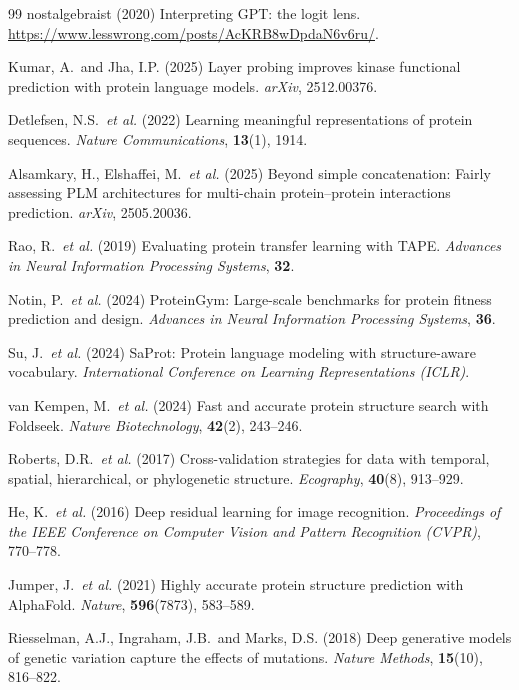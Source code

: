 \documentclass[11pt,a4paper]{article}
\begin{document}
\begin{thebibliography}{99}
nostalgebraist (2020)
Interpreting GPT: the logit lens.
\url{https://www.lesswrong.com/posts/AcKRB8wDpdaN6v6ru/}.

Kumar, A.\ and Jha, I.P. (2025)
Layer probing improves kinase functional prediction with protein language models.
\textit{arXiv}, 2512.00376.

Detlefsen, N.S.\ \textit{et al.} (2022)
Learning meaningful representations of protein sequences.
\textit{Nature Communications}, \textbf{13}(1), 1914.

Alsamkary, H., Elshaffei, M.\ \textit{et al.} (2025)
Beyond simple concatenation: Fairly assessing PLM architectures for multi-chain
protein--protein interactions prediction.
\textit{arXiv}, 2505.20036.

Rao, R.\ \textit{et al.} (2019)
Evaluating protein transfer learning with TAPE.
\textit{Advances in Neural Information Processing Systems}, \textbf{32}.

Notin, P.\ \textit{et al.} (2024)
ProteinGym: Large-scale benchmarks for protein fitness prediction and design.
\textit{Advances in Neural Information Processing Systems}, \textbf{36}.

Su, J.\ \textit{et al.} (2024)
SaProt: Protein language modeling with structure-aware vocabulary.
\textit{International Conference on Learning Representations (ICLR)}.

van Kempen, M.\ \textit{et al.} (2024)
Fast and accurate protein structure search with Foldseek.
\textit{Nature Biotechnology}, \textbf{42}(2), 243--246.

Roberts, D.R.\ \textit{et al.} (2017)
Cross-validation strategies for data with temporal, spatial, hierarchical, or
phylogenetic structure.
\textit{Ecography}, \textbf{40}(8), 913--929.

He, K.\ \textit{et al.} (2016)
Deep residual learning for image recognition.
\textit{Proceedings of the IEEE Conference on Computer Vision and Pattern Recognition (CVPR)},
770--778.

Jumper, J.\ \textit{et al.} (2021)
Highly accurate protein structure prediction with AlphaFold.
\textit{Nature}, \textbf{596}(7873), 583--589.

Riesselman, A.J., Ingraham, J.B.\ and Marks, D.S. (2018)
Deep generative models of genetic variation capture the effects of mutations.
\textit{Nature Methods}, \textbf{15}(10), 816--822.


\end{thebibliography}
\end{document}
